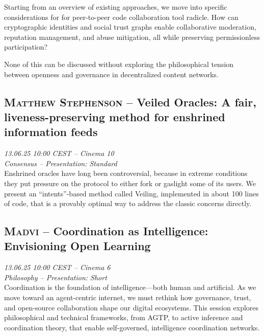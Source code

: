 Starting from an overview of existing approaches, we move into specific considerations for for peer-to-peer code collaboration tool radicle. How can cryptographic identities and social trust graphs enable collaborative moderation, reputation management, and abuse mitigation, all while preserving permissionless participation?

None of this can be discussed without  exploring the philosophical tension between openness and governance in decentralized content networks.

\clearpage
\subsection {\textsc{Matthew Stephenson}  -- Veiled Oracles: A fair, liveness-preserving method for enshrined information feeds} \noindent \textit {13.06.25 10:00 CEST -- Cinema 10\\ Consensus -- Presentation: Standard}\\[1em] Enshrined oracles have long been controversial, because in extreme conditions they put pressure on the protocol to either fork or gaslight some of its users. We present an ``intents''-based method called Veiling, implemented in about 100 lines of code, that is a provably optimal way to address the classic concerns directly.

\clearpage
\subsection {\textsc{Madvi}  -- Coordination as Intelligence: Envisioning Open Learning} \noindent \textit {13.06.25 10:00 CEST -- Cinema 6\\ Philosophy -- Presentation: Short}\\[1em] Coordination is the foundation of intelligence—both human and artificial. As we move toward an agent-centric internet, we must rethink how governance, trust, and open-source collaboration shape our digital ecosystems. This session explores philosophical and technical frameworks, from AGTP, to active inference and coordination theory, that enable self-governed, intelligence coordination networks.

\clearpage
